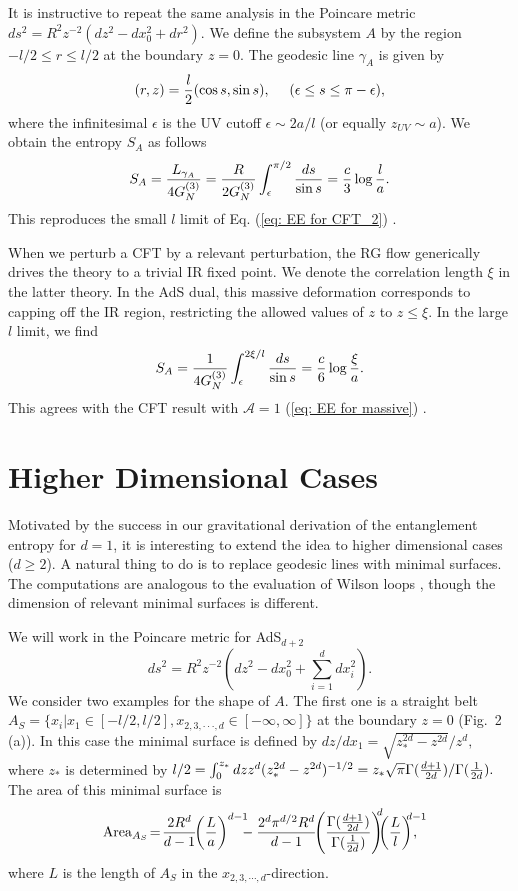 \documentclass[twocolumn,amsmath,amssymb,nofootinbib,eqsecnum,tighten,prd]{revtex4}
\def\ep{{\epsilon}}
\def\frac#1#2{{#1\over #2}}
\def\s{\sqrt}
\def\f {\frac}
\def\ddd{\cdot\cdot\cdot}
\def\ep{\epsilon}
\def\ep{{\epsilon}}
\def\frac#1#2{{#1\over #2}}
\def\s{\sqrt}
\def\be{\begin{equation}}
\def\ee{\end{equation}}
\begin{document}
It is instructive to repeat the same analysis in the Poincare
metric $ ds^2=R^2 z^{-2}(dz^2-dx_0^2+dr^2). $
We define the subsystem $A$ by the region $-l/2\leq r\leq l/2$ at the boundary  $z=0$.
The geodesic line $\gamma_A$ is given by  \be (r,z)=\f{l}{2}(\cos
s,\sin s),\ \ \ \ (\ep\leq s \leq \pi-\ep), \label{minc} \ee where
the infinitesimal $\ep$ is
the UV cutoff $\ep\sim 2a/l$ (or equally $z_{UV}\sim a$). We obtain the entropy $S_A$
as follows \be S_A=\f{L_{\gamma_A}}
{4G^{(3)}_N}=\f{R}{2G^{(3)}_N}\int^{\pi/2}_\ep
\f{ds}{\sin s}=\f{c}{3}\log\f{l}{a}. \ee
This reproduces  the small $l$ limit
of Eq. (\ref{eq: EE for CFT_2}) \cite{Holzhey94} .

When we perturb a CFT by a relevant perturbation, the RG flow
generically drives the theory to a trivial IR fixed point.  We
denote the correlation length $\xi$ in the latter theory. In the
AdS dual, this massive deformation corresponds to capping
off the IR region, restricting the allowed values of $z$ to $z\leq
\xi$. In the large $l$ limit, we find \be
S_A =\f{1}{4G^{(3)}_N} \int^{2\xi/l}_{\ep}\f{ds}{\sin
s}=\f{c}{6}\log\f{\xi}{a}. \ee
This agrees with the CFT result
with $\mathcal{A}=1$
(\ref{eq: EE for massive})  \cite{VLRK,Calabrese04}.


\section{Higher Dimensional Cases}

Motivated by the success in
 our gravitational derivation of the entanglement
entropy for $d=1$, it is interesting to extend the idea to higher dimensional
cases ($d\geq 2$).
A natural thing to do is to replace
geodesic lines with minimal surfaces.
The computations are
analogous to the evaluation
of Wilson loops \cite{Wilsonline}, though the dimension of relevant
minimal surfaces is different.


We will work in the Poincare metric for AdS$_{d+2}$ \be ds^2=R^2
z^{-2} (dz^2-dx_0^2+\sum_{i=1}^d dx_i^2).  \label{Poincare} \ee We
consider two examples for the shape of $A$. The first one is a
straight belt $A_{S}=\{x_i|x_1\in [-l/2,l/2], x_{2,3,\ddd,d}\in
[-\infty,\infty]\}$ at the boundary $z=0$ (Fig.\ 2 (a)). In this
case the minimal surface is defined by $
dz/dx_1=\s{z^{2d}_*-z^{2d}}/z^d, $ where $z_*$ is determined by $
l/2=\int^{z_*}_{0}dz z^d (z^{2d}_*-z^{2d})^{-1/2} =z_* \s{\pi}
\Gamma(\f{d+1}{2d})/\Gamma(\f{1}{2d}). $ The area of this minimal
surface is \be {\rm
Area}_{A_{S}}\!=\!\f{2R^d}{d-1}\!\!\left(\f{L}{a}\right)^{d-1}\!\!\!\!
-\f{2^d \pi^{d/2} R^{d}}{d-1}\!\!\left(\f{\Gamma(\f{d+1}{2d})}
{\Gamma(\f{1}{2d})}\right)^{\!\!\!d}\!\!\!
\left(\f{L}{l}\right)^{\!\!\! d-1}\!\!\!\!\!\!\!, \label{areaone}
\ee where $L$ is the length of $A_S$ in the
$x_{2,3,\cdots,d}$-direction.
\end{document}
